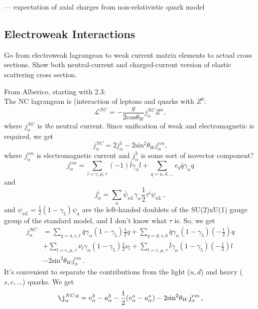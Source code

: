   --- expectation of axial charges from non-relativistic quark model

\subsection{Electroweak Interactions}
    Go from electroweak lagrangean to weak current matrix elements to actual
    cross sections. Show both neutral-current and charged-current version of
    elastic scattering cross section.

  From Alberico, starting with 2.3: \\
  The NC lagrangean is (interaction of leptons and quarks with $Z^0$:
  \[
      \mathcal{L}^{NC} = -\frac{g}{2\textrm{cos}\theta_W}j_{\alpha}^{NC}Z^{\alpha},
  \]
  where $j_{\alpha}^{NC}$ is \textit{the} neutral current. Since unification of
  weak and electromagnetic is required, we get
  \[
    j_{\alpha}^{NC} = 2j_{\alpha}^3 - 2\textrm{sin}^2\theta_W j_{\alpha}^{em},
  \]
  where $j_{\alpha}^{em}$ is electromagnetic current and $j_{\alpha}^3$ is some
  sort of isovector component?
  \[
      j_{\alpha}^{em} = \sum_{l = e,\mu,\tau} (-1)\bar{l}\gamma_{\alpha}l + \sum_{q=u,d,...}e_q\bar{q}\gamma_{\alpha}q
  \]
  and
  \[
    j_{\alpha}^i = \sum_a \bar{\psi}_{aL} \gamma_{\alpha}\frac{1}{2} \tau^i \psi_{aL} \,,
  \]
  and $\psi_{aL} = \frac{1}{2}(1-\gamma_5)\psi_a$ are the left-handed doublets
  of the SU(2)xU(1) gauge group of the standard model, and I don't know what $\tau$ is.
  So, we get
  \begin{align*}
      j_{\alpha}^{NC} &= \sum_{q=u,c,t}\bar{q}\gamma_{\alpha}(1-\gamma_5)\frac{1}{2}q
                       + \sum_{q=d,s,b}\bar{q}\gamma_{\alpha}(1-\gamma_5)\left(-\frac{1}{2}\right)q \\
                      &+ \sum_{l=e,\mu,\tau}\bar{\nu_l}\gamma_{\alpha}(1-\gamma_5)\frac{1}{2}\nu_l
                       + \sum_{l=e,\mu,\tau}\bar{l}\gamma_{\alpha}(1-\gamma_5)\left(-\frac{1}{2}\right)l \\
                      &- 2\mathrm{sin}^2\theta_W j_{\alpha}^{em} \,.
  \end{align*}
  It's convenient to separate the contributions from the light ($u,d$) and
  heavy ($s,c,...$) quarks. We get
  \[
    \j_{\alpha}^{NC;q} = v_{\alpha}^3 - a_{\alpha}^3 - \frac{1}{2}(v_{\alpha}^s - a_{\alpha}^s) - 2\mathrm{sin}^2\theta_W j_{\alpha}^{em} \,,
  \]
